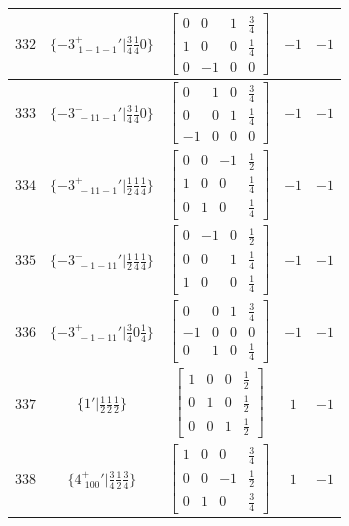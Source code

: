 \documentclass[fleqn,8pt]{jsarticle}
\begin{document}
\begin{longtable}{ccccc}
$ 332 $ & $ \{-3^{+}_{\,\,1-1-1}{}'|\frac{3}{4} \frac{1}{4} 0\} $ & $ \begin{bmatrix} 0 & 0 & 1 & \frac{3}{4} \\ 1 & 0 & 0 & \frac{1}{4} \\ 0 & -1 & 0 & 0 \end{bmatrix} $ & $ -1 $ & $ -1 $ \\ \hline
$ 333 $ & $ \{-3^{-}_{\,\,-11-1}{}'|\frac{3}{4} \frac{1}{4} 0\} $ & $ \begin{bmatrix} 0 & 1 & 0 & \frac{3}{4} \\ 0 & 0 & 1 & \frac{1}{4} \\ -1 & 0 & 0 & 0 \end{bmatrix} $ & $ -1 $ & $ -1 $ \\ \hline
$ 334 $ & $ \{-3^{+}_{\,\,-11-1}{}'|\frac{1}{2} \frac{1}{4} \frac{1}{4}\} $ & $ \begin{bmatrix} 0 & 0 & -1 & \frac{1}{2} \\ 1 & 0 & 0 & \frac{1}{4} \\ 0 & 1 & 0 & \frac{1}{4} \end{bmatrix} $ & $ -1 $ & $ -1 $ \\ \hline
$ 335 $ & $ \{-3^{-}_{\,\,-1-11}{}'|\frac{1}{2} \frac{1}{4} \frac{1}{4}\} $ & $ \begin{bmatrix} 0 & -1 & 0 & \frac{1}{2} \\ 0 & 0 & 1 & \frac{1}{4} \\ 1 & 0 & 0 & \frac{1}{4} \end{bmatrix} $ & $ -1 $ & $ -1 $ \\ \hline
$ 336 $ & $ \{-3^{+}_{\,\,-1-11}{}'|\frac{3}{4} 0 \frac{1}{4}\} $ & $ \begin{bmatrix} 0 & 0 & 1 & \frac{3}{4} \\ -1 & 0 & 0 & 0 \\ 0 & 1 & 0 & \frac{1}{4} \end{bmatrix} $ & $ -1 $ & $ -1 $ \\ \hline
$ 337 $ & $ \{1{}'|\frac{1}{2} \frac{1}{2} \frac{1}{2}\} $ & $ \begin{bmatrix} 1 & 0 & 0 & \frac{1}{2} \\ 0 & 1 & 0 & \frac{1}{2} \\ 0 & 0 & 1 & \frac{1}{2} \end{bmatrix} $ & $ 1 $ & $ -1 $ \\ \hline
$ 338 $ & $ \{4^{+}_{\,\,100}{}'|\frac{3}{4} \frac{1}{2} \frac{3}{4}\} $ & $ \begin{bmatrix} 1 & 0 & 0 & \frac{3}{4} \\ 0 & 0 & -1 & \frac{1}{2} \\ 0 & 1 & 0 & \frac{3}{4} \end{bmatrix} $ & $ 1 $ & $ -1 $ \\ \hline

\end{longtable}
\end{document}
